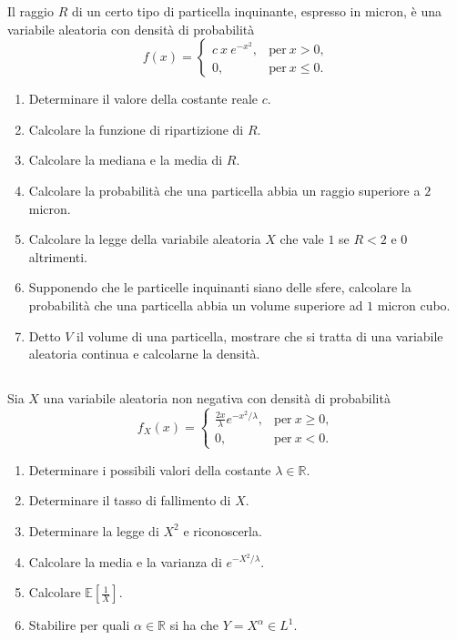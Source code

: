 Il raggio $R$ di un certo tipo di particella inquinante, espresso in micron, è una variabile aleatoria con densità di probabilità
\begin{equation*}
f( x) =\begin{cases}
c\ x\ e^{-x^{2}} , & \text{per} \ x >0,\\
0, & \text{per} \ x\leq 0.
\end{cases}
\end{equation*}
\begin{enumerate}
\item Determinare il valore della costante reale $c$.
\item Calcolare la funzione di ripartizione di $R$.
\item Calcolare la mediana e la media di $R$.
\item Calcolare la probabilità che una particella abbia un raggio superiore a $2$ micron.
\item Calcolare la legge della variabile aleatoria $X$ che vale $1$ se $R< 2$ e $0$ altrimenti.
\item Supponendo che le particelle inquinanti siano delle sfere, calcolare la probabilità che una particella abbia un volume superiore ad $1$ micron cubo.
\item Detto $V$ il volume di una particella, mostrare che si tratta di una variabile aleatoria continua e calcolarne la densità.
\end{enumerate}
\subsection{}

Sia $X$ una variabile aleatoria non negativa con densità di probabilità
\begin{equation*}
f_{X}( x) =\begin{cases}
\frac{2x}{\lambda } e^{-x^{2} /\lambda } , & \text{per} \ x\geq 0,\\
0, & \text{per} \ x< 0.
\end{cases}
\end{equation*}
\begin{enumerate}
\item Determinare i possibili valori della costante $\lambda \in \mathbb{R}$.
\item Determinare il tasso di fallimento di $X$.
\item Determinare la legge di $X^{2}$ e riconoscerla.
\item Calcolare la media e la varianza di $e^{-X^{2} /\lambda }$.
\item Calcolare $\mathbb{E}\left[\frac{1}{X}\right]$.
\item Stabilire per quali $\alpha \in \mathbb{R}$ si ha che $Y=X^{\alpha } \in L^{1}$.
\end{enumerate}
